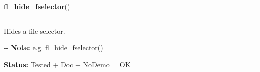     \label{xformslib:flgoodies:fl_hide_fselector}

    \vspace{0.5ex}

\hspace{.8\funcindent}\begin{boxedminipage}{\funcwidth}

    \raggedright \textbf{fl\_hide\_fselector}()

    \vspace{-1.5ex}

    \rule{\textwidth}{0.5\fboxrule}
\setlength{\parskip}{2ex}

Hides a file selector.

-{}-
\setlength{\parskip}{1ex}
\textbf{Note:} 
e.g. fl\_hide\_fselector()


\textbf{Status:} 
Tested + Doc + NoDemo = OK


    \end{boxedminipage}

    \label{xformslib:flgoodies:fl_set_fselector_filetype_marker}

    \vspace{0.5ex}


